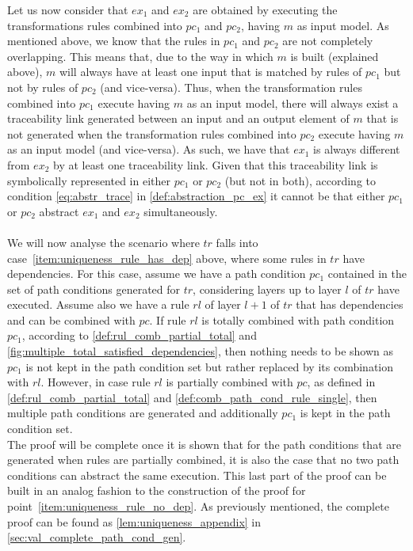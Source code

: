 \begin{ps}
Let us now consider that $ex_1$ and $ex_2$ are obtained by executing the transformations rules combined into $pc_1$ and $pc_2$, having $m$ as input model. As mentioned above, we know that the rules in $pc_1$ and $pc_2$ are not completely overlapping. This means that, due to the way in which $m$ is built (explained above), $m$ will always have at least one input that is matched by rules of $pc_1$ but not by rules of $pc_2$ (and vice-versa). Thus, when the transformation rules combined into $pc_1$ execute having $m$ as an input model, there will always exist a traceability link generated between an input and an output element of $m$ that is not generated when the transformation rules combined into $pc_2$ execute having $m$ as an input model (and vice-versa). As such, we have that $ex_1$ is always different from $ex_2$ by at least one traceability link. Given that this traceability link is symbolically represented in either $pc_1$ or $pc_2$ (but not in both), according to condition \cref{eq:abstr_trace} in \cref{def:abstraction_pc_ex} it cannot be that either $pc_1$ or $pc_2$ abstract $ex_1$ and $ex_2$ simultaneously.\\\\
We will now analyse the scenario where $tr$ falls into case~\ref{item:uniqueness_rule_has_dep} above, where some rules in $tr$ have dependencies. For this case, assume we have a path condition $pc_1$ contained in the set of path conditions generated for $tr$, considering layers up to layer $l$ of $tr$ have executed. Assume also we have a rule $rl$ of layer $l+1$ of $tr$ that has dependencies and can be combined with $pc$. If rule $rl$ is totally combined with path condition $pc_1$, according to \cref{def:rul_comb_partial_total} and \cref{fig:multiple_total_satisfied_dependencies}, then nothing needs to be shown as $pc_1$ is not kept in the path condition set but rather replaced by its combination with $rl$. However, in case rule $rl$ is partially combined with $pc$, as defined in \cref{def:rul_comb_partial_total} and \cref{def:comb_path_cond_rule_single}, then multiple path conditions are generated and additionally $pc_1$ is kept in the path condition set.\\The proof will be complete once it is shown that for the path conditions that are generated when rules are partially combined, it is also the case that no two path conditions can abstract the same execution. This last part of the proof can be built in an analog fashion to the construction of the proof for point~\ref{item:uniqueness_rule_no_dep}. As previously mentioned, the complete proof can be found as \cref{lem:uniqueness_appendix} in \cref{sec:val_complete_path_cond_gen}.

\end{ps}

